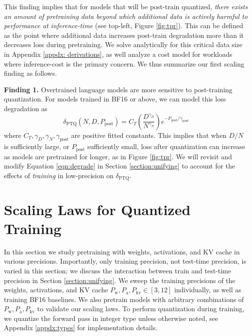 \documentclass[11pt]{article}
\begin{document}
This finding implies that for models that will be post-train quantized, \textit{there exists an amount of pretraining data beyond which additional data is actively harmful to performance at inference-time} (see top-left, Figure \ref{fig:tpr}). This can be defined as the point where additional data increases post-train degradation more than it decreases loss during pretraining. We solve analytically for this critical data size in Appendix \ref{appdx: derivations}, as well analyze a cost model for workloads where inference-cost is the primary concern. We thus summarize our first scaling finding as follows. 

\begin{tcolorbox}[colback=lightblue!10, colframe=lightblue!50!black, boxrule=0.5mm, arc=2mm]
\label{finding:1}
    \textbf{Finding 1.} Overtrained language models are more sensitive to post-training quantization. For models trained in BF16 or above, we can model this loss degradation as
    $$\delta_\text{PTQ}(N, D, P_\text{post}) = C_T \left(\frac{D^{\gamma_D}}{N^{\gamma_N}}\right) e^{-P_\text{post}/\gamma_\text{post}}$$ where $C_T, \gamma_D, \gamma_N, \gamma_\text{post}$ are positive fitted constants. This implies that when $D/N$ is sufficiently large, or $P_\text{post}$ sufficiently small, loss after quantization can increase as models are pretrained for longer, as in Figure \ref{fig:tpr}. We will revisit and modify Equation \ref{eqn:degrade} in Section \ref{section:unifying} to account for the effects of \textit{training} in low-precision on $\delta_\text{PTQ}$.
\end{tcolorbox}


\section{Scaling Laws for Quantized Training}
\label{section:training}

In this section we study pretraining with weights, activations, and KV cache in various precisions. Importantly, only training precision, not test-time precision, is varied in this section; we discuss the interaction between train and test-time precision in Section \ref{section:unifying}. We sweep the training precisions of the weights, activations, and KV cache $P_\text{w}, P_\text{a}, P_\text{kv} \in [3, 12]$ individually, as well as training BF16 baselines. We also pretrain models with arbitrary combinations of $P_\text{w}, P_\text{a}, P_\text{kv}$ to validate our scaling laws. To perform quantization during training, we quantize the forward pass in integer type unless otherwise noted, see Appendix \ref{appdx:types} for implementation details.
\end{document}

